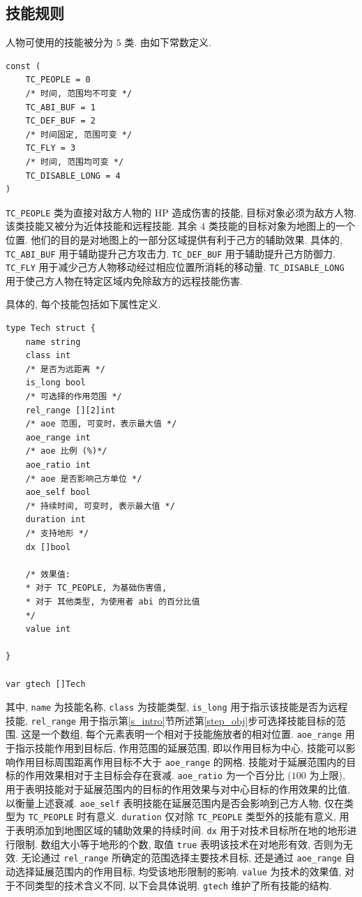 \documentclass[UTF8, zihao=-4]{ctexart} %
\newcommand{\lcode}{\lstinline} % 段内插入代码
\begin{document}
\subsection{技能规则}
人物可使用的技能被分为 $5$ 类. 由如下常数定义.
\begin{lstlisting}
const (
	TC_PEOPLE = 0
	/* 时间, 范围均不可变 */
	TC_ABI_BUF = 1
	TC_DEF_BUF = 2
	/* 时间固定, 范围可变 */
	TC_FLY = 3
	/* 时间, 范围均可变 */
	TC_DISABLE_LONG = 4
)
\end{lstlisting}
\lcode{TC_PEOPLE} 类为直接对敌方人物的 HP 造成伤害的技能, 目标对象必须为敌方人物. 
该类技能又被分为近体技能和远程技能.
其余 $4$ 类技能的目标对象为地图上的一个位置. 他们的目的是对地图上的一部分区域提供有利于己方的辅助效果.
具体的, \lcode{TC_ABI_BUF} 用于辅助提升己方攻击力. \lcode{TC_DEF_BUF} 用于辅助提升己方防御力.
\lcode{TC_FLY} 用于减少己方人物移动经过相应位置所消耗的移动量.
\lcode{TC_DISABLE_LONG} 用于使己方人物在特定区域内免除敌方的远程技能伤害.

具体的, 每个技能包括如下属性定义.
\begin{lstlisting}
type Tech struct {
	name string
	class int
	/* 是否为远距离 */
	is_long bool
	/* 可选择的作用范围 */
	rel_range [][2]int
	/* aoe 范围, 可变时，表示最大值 */
	aoe_range int
	/* aoe 比例 (%)*/
	aoe_ratio int
	/* aoe 是否影响己方单位 */
	aoe_self bool
	/* 持续时间, 可变时, 表示最大值 */
	duration int
	/* 支持地形 */
	dx []bool

	/* 效果值:
	* 对于 TC_PEOPLE, 为基础伤害值, 
	* 对于 其他类型, 为使用者 abi 的百分比值
	*/
	value int

}

var gtech []Tech
\end{lstlisting}
其中, \lcode{name} 为技能名称, \lcode{class} 为技能类型, 
\lcode{is_long} 用于指示该技能是否为远程技能,
\lcode{rel_range} 用于指示第\ref{s_intro}节所述第\ref{step_obj}步可选择技能目标的范围.
这是一个数组, 每个元素表明一个相对于技能施放者的相对位置.
\lcode{aoe_range} 用于指示技能作用到目标后, 作用范围的延展范围, 即以作用目标为中心, 
技能可以影响作用目标周围距离作用目标不大于 \lcode{aoe_range} 的网格.
技能对于延展范围内的目标的作用效果相对于主目标会存在衰减.
\lcode{aoe_ratio} 为一个百分比 ($100$ 为上限), 用于表明技能对于延展范围内的目标的作用效果与对中心目标的作用效果的比值, 以衡量上述衰减. 
\lcode{aoe_self} 表明技能在延展范围内是否会影响到己方人物, 仅在类型为 \lcode{TC_PEOPLE} 时有意义.
\lcode{duration} 仅对除 \lcode{TC_PEOPLE} 类型外的技能有意义, 用于表明添加到地图区域的辅助效果的持续时间.
\lcode{dx} 用于对技术目标所在地的地形进行限制. 数组大小等于地形的个数, 取值 \lcode{true} 表明该技术在对地形有效, 否则为无效.
无论通过 \lcode{rel_range} 所确定的范围选择主要技术目标, 还是通过 \lcode{aoe_range} 自动选择延展范围内的作用目标, 均受该地形限制的影响.
\lcode{value} 为技术的效果值, 对于不同类型的技术含义不同, 以下会具体说明. \lcode{gtech} 维护了所有技能的结构.
\end{document}
